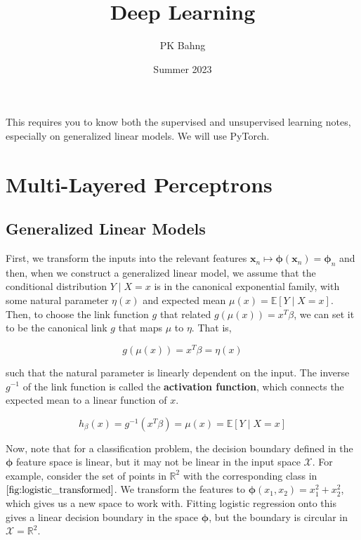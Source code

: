 \documentclass{article}
\theoremstyle{definition}
\theoremstyle{remark}
\theoremstyle{definition}
\begin{document}
\pagestyle{fancy}

\cfoot{\thepage / \pageref{LastPage}}

\title{Deep Learning}
\author{PK Bahng}
\date{Summer 2023}

\maketitle

\tableofcontents

\pagebreak 

This requires you to know both the supervised and unsupervised learning notes, especially on generalized linear models. We will use PyTorch. 

\section{Multi-Layered Perceptrons}

  \subsection{Generalized Linear Models}

     First, we transform the inputs into the relevant features $\mathbf{x}_n \mapsto \boldsymbol{\phi} (\mathbf{x}_n) = \boldsymbol{\phi}_n$ and then, when we construct a generalized linear model, we assume that the conditional distribution $Y \mid X = x$ is in the canonical exponential family, with some natural parameter $\eta(x)$ and expected mean $\mu(x) = \mathbb{E}[Y \mid X = x]$. Then, to choose the link function $g$ that related $g(\mu(x)) = x^T \beta$, we can set it to be the canonical link $g$ that maps $\mu$ to $\eta$. That is, 
    
    \[g(\mu(x)) = x^T \beta = \eta (x)\]

    such that the natural parameter is linearly dependent on the input. The inverse $g^{-1}$ of the link function is called the \textbf{activation function}, which connects the expected mean to a linear function of $x$. 

      \[h_\beta (x) = g^{-1} (x^T \beta) = \mu(x) = \mathbb{E}[Y \mid X = x]\]

    Now, note that for a classification problem, the decision boundary defined in the $\boldsymbol{\phi}$ feature space is linear, but it may not be linear in the input space $\mathcal{X}$. For example, consider the set of points in $\mathbb{R}^2$ with the corresponding class in $\ref{fig:logistic_transformed}$. We transform the features to $\boldsymbol{\phi}(x_1, x_2) = x_1^2 + x_2^2$, which gives us a new space to work with. Fitting logistic regression onto this gives a linear decision boundary in the space $\boldsymbol{\phi}$, but the boundary is circular in $\mathcal{X} = \mathbb{R}^2$. 
\end{document}
